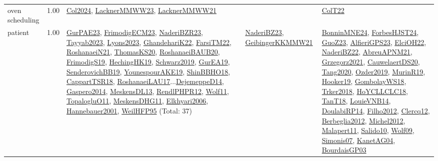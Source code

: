 {\begin{longtable}{p{3cm}r>{\raggedright\arraybackslash}p{6cm}>{\raggedright\arraybackslash}p{6cm}>{\raggedright\arraybackslash}p{8cm}}
\index{oven scheduling}\index{ApplicationAreas!oven scheduling}oven scheduling &  1.00 & \hyperref[detail:Col2024]{Col2024}, \hyperref[detail:LacknerMMWW23]{LacknerMMWW23}, \hyperref[detail:LacknerMMWW21]{LacknerMMWW21} &  & \hyperref[detail:ColT22]{ColT22}\\
\index{patient}\index{ApplicationAreas!patient}patient &  1.00 & \hyperref[detail:GurPAE23]{GurPAE23}, \hyperref[detail:FrimodigECM23]{FrimodigECM23}, \hyperref[detail:NaderiBZR23]{NaderiBZR23}, \hyperref[detail:Tayyab2023]{Tayyab2023}, \hyperref[detail:Lyons2023]{Lyons2023}, \hyperref[detail:GhandehariK22]{GhandehariK22}, \hyperref[detail:FarsiTM22]{FarsiTM22}, \hyperref[detail:RoshanaeiN21]{RoshanaeiN21}, \hyperref[detail:ThomasKS20]{ThomasKS20}, \hyperref[detail:RoshanaeiBAUB20]{RoshanaeiBAUB20}, \hyperref[detail:FrimodigS19]{FrimodigS19}, \hyperref[detail:HechingHK19]{HechingHK19}, \hyperref[detail:Schwarz2019]{Schwarz2019}, \hyperref[detail:GurEA19]{GurEA19}, \hyperref[detail:SenderovichBB19]{SenderovichBB19}, \hyperref[detail:YounespourAKE19]{YounespourAKE19}, \hyperref[detail:ShinBBHO18]{ShinBBHO18}, \hyperref[detail:CappartTSR18]{CappartTSR18}, \hyperref[detail:RoshanaeiLAU17]{RoshanaeiLAU17}...\hyperref[detail:DejemeppeD14]{DejemeppeD14}, \hyperref[detail:Gaspero2014]{Gaspero2014}, \hyperref[detail:MeskensDL13]{MeskensDL13}, \hyperref[detail:RendlPHPR12]{RendlPHPR12}, \hyperref[detail:Wolf11]{Wolf11}, \hyperref[detail:TopalogluO11]{TopalogluO11}, \hyperref[detail:MeskensDHG11]{MeskensDHG11}, \hyperref[detail:Elkhyari2006]{Elkhyari2006}, \hyperref[detail:Hannebauer2001]{Hannebauer2001}, \hyperref[detail:WeilHFP95]{WeilHFP95} (Total: 37) & \hyperref[detail:NaderiBZ23]{NaderiBZ23}, \hyperref[detail:GeibingerKKMMW21]{GeibingerKKMMW21} & \hyperref[detail:BonninMNE24]{BonninMNE24}, \hyperref[detail:ForbesHJST24]{ForbesHJST24}, \hyperref[detail:GuoZ23]{GuoZ23}, \hyperref[detail:AlfieriGPS23]{AlfieriGPS23}, \hyperref[detail:ElciOH22]{ElciOH22}, \hyperref[detail:NaderiBZ22]{NaderiBZ22}, \hyperref[detail:AbreuAPNM21]{AbreuAPNM21}, \hyperref[detail:Grzegorz2021]{Grzegorz2021}, \hyperref[detail:CauwelaertDS20]{CauwelaertDS20}, \hyperref[detail:Tang2020]{Tang2020}, \hyperref[detail:Ozder2019]{Ozder2019}, \hyperref[detail:MurinR19]{MurinR19}, \hyperref[detail:Hooker19]{Hooker19}, \hyperref[detail:GombolayWS18]{GombolayWS18}, \hyperref[detail:Trker2018]{Trker2018}, \hyperref[detail:HoYCLLCLC18]{HoYCLLCLC18}, \hyperref[detail:TanT18]{TanT18}, \hyperref[detail:LouieVNB14]{LouieVNB14}, \hyperref[detail:DoulabiRP14]{DoulabiRP14}, \hyperref[detail:Filho2012]{Filho2012}, \hyperref[detail:Clercq12]{Clercq12}, \hyperref[detail:Berbeglia2012]{Berbeglia2012}, \hyperref[detail:Michel2012]{Michel2012}, \hyperref[detail:Malapert11]{Malapert11}, \hyperref[detail:Salido10]{Salido10}, \hyperref[detail:Wolf09]{Wolf09}, \hyperref[detail:Simonis07]{Simonis07}, \hyperref[detail:KanetAG04]{KanetAG04}, \hyperref[detail:BourdaisGP03]{BourdaisGP03}\\

\end{longtable}}
